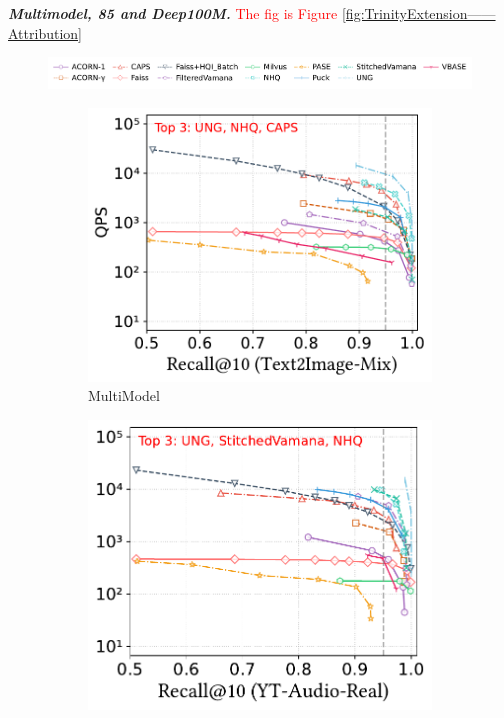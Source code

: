 \documentclass[sigconf, nonacm]{acmart}
\begin{document}
	\textit{\textbf{Multimodel, 85 and Deep100M.}} \textcolor{red}{The fig is Figure \ref{fig:TrinityExtension——Attribution}}
	
	\begin{figure}[t]
		\centering
		
		
		\hspace*{5pt}
		\includegraphics[width=0.98\columnwidth]{figures/exp/attribute_legend.pdf}
		
		\begin{subfigure}[t]{0.332\columnwidth}
			\centering
			\captionsetup{font=small}
			\includegraphics[width=\linewidth]{figures/exp/attribute_multimodel.pdf}
			\caption{\footnotesize MultiModel}
			\label{fig:rangeFilter_build_time}
		\end{subfigure}
		\hfill
		\begin{subfigure}[t]{0.315\columnwidth}
			\centering
			\includegraphics[width=\linewidth]{figures/exp/attribute_85.pdf}

\end{subfigure}
\end{figure}
\end{document}
